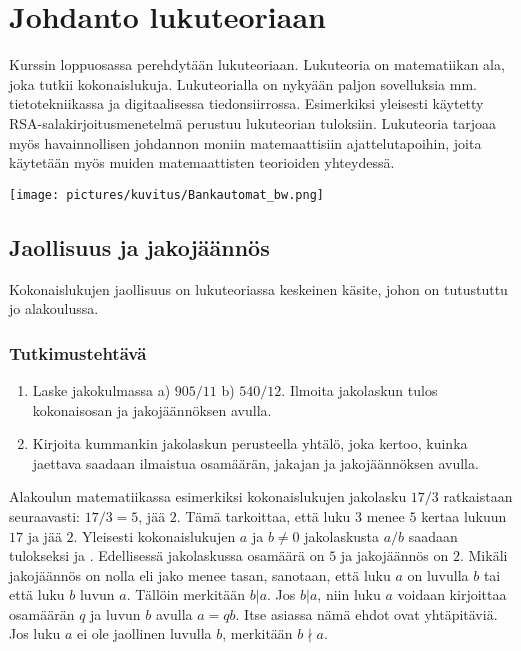 \chapter{Johdanto lukuteoriaan}

Kurssin loppuosassa perehdytään lukuteoriaan. Lukuteoria on matematiikan ala, joka tutkii kokonaislukuja. Lukuteorialla on nykyään paljon sovelluksia mm. tietotekniikassa ja digitaalisessa tiedonsiirrossa. Esimerkiksi yleisesti käytetty RSA-sala\-kir\-joi\-tus\-me\-ne\-tel\-mä perustuu lukuteorian tuloksiin. Lukuteoria tarjoaa myös havainnollisen johdannon moniin matemaattisiin ajattelutapoihin, joita käytetään myös muiden matemaattisten teorioiden yhteydessä.

\begin{center}
\texttt{[image: pictures/kuvitus/Bankautomat\_bw.png]}
\end{center}


\section{Jaollisuus ja jakojäännös}
\label{jaollisuus}
Kokonaislukujen jaollisuus on lukuteoriassa keskeinen käsite, johon on tutustuttu jo alakoulussa.

\subsection*{Tutkimustehtävä} %
\begin{enumerate}
\item
Laske jakokulmassa a) $905 / 11$ b) $540 / 12$. Ilmoita jakolaskun tulos kokonaisosan ja jakojäännöksen avulla.
\item
Kirjoita kummankin jakolaskun perusteella yhtälö, joka kertoo, kuinka jaettava saadaan
ilmaistua osamäärän, jakajan ja jakojäännöksen avulla.
\end{enumerate}


Alakoulun matematiikassa esimerkiksi kokonaislukujen jakolasku $17/3$ ratkaistaan seuraavasti: $17/3 = 5$, jää $2$. Tämä tarkoittaa, että luku $3$ menee $5$ kertaa lukuun $17$ ja jää $2$. Yleisesti kokonaislukujen $a$ ja $b \neq 0$ jakolaskusta $a/b$ saadaan tulokseksi  ja . Edellisessä jakolaskussa osamäärä on $5$ ja jakojäännös on $2$. Mikäli jakojäännös on nolla eli jako menee tasan, sanotaan, että luku $a$ on  luvulla $b$ tai että luku $b$  luvun $a$. Tällöin merkitään $b|a$. Jos $b|a$, niin luku $a$ voidaan kirjoittaa osamäärän $q$ ja luvun $b$ avulla $a = qb$. Itse asiassa nämä ehdot ovat yhtäpitäviä. Jos luku $a$ ei ole jaollinen luvulla $b$, merkitään $b \nmid a$.

